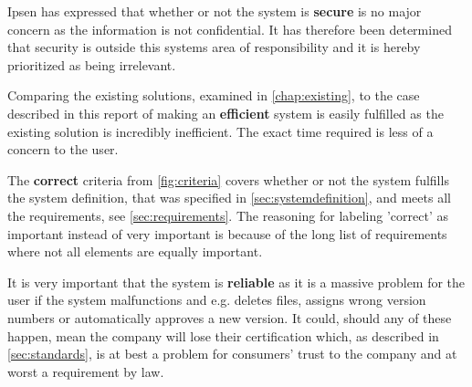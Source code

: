Ipsen has expressed that whether or not the system is \textbf{secure} is no major concern as the information is not confidential.
It has therefore been determined that security is outside this systems area of responsibility and it is hereby prioritized as being irrelevant.

Comparing the existing solutions, examined in \cref{chap:existing}, to the case described in this report of making an \textbf{efficient} system is easily fulfilled as the existing solution is incredibly inefficient.
The exact time required is less of a concern to the user.

The \textbf{correct} criteria from \cref{fig:criteria} covers whether or not the system fulfills the system definition, that was specified in \cref{sec:systemdefinition}, and meets all the requirements, see \cref{sec:requirements}.
The reasoning for labeling 'correct' as important instead of very important is because of the long list of requirements where not all elements are equally important.

It is very important that the system is \textbf{reliable} as it is a massive problem for the user if the system malfunctions and e.g. deletes files, assigns wrong version numbers or automatically approves a new version.
It could, should any of these happen, mean the company will lose their certification which, as described in \cref{sec:standards}, is at best a problem for consumers' trust to the company and at worst a requirement by law.

